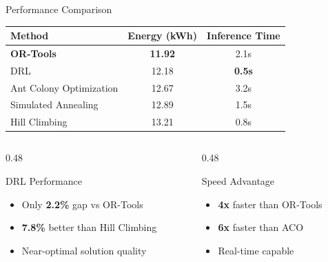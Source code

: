 \documentclass[aspectratio=169,11pt]{beamer}
\begin{document}
\begin{frame}{Performance Comparison}
    \begin{center}
        \begin{tabular}{lcc}
            \toprule
            \textbf{Method} & \textbf{Energy (kWh)} & \textbf{Inference Time} \\
            \midrule
            \textbf{OR-Tools} & \textbf{11.92} & 2.1s \\
            DRL  & 12.18 & \textbf{0.5s} \\
            Ant Colony Optimization & 12.67 & 3.2s \\
            Simulated Annealing & 12.89 & 1.5s \\
            Hill Climbing & 13.21 & 0.8s \\
            \bottomrule
        \end{tabular}
    \end{center}

    \vspace{0.5cm}
    \begin{columns}[T]
        \begin{column}{0.48\textwidth}
            \begin{exampleblock}{DRL Performance}
                \begin{itemize}
                    \item Only \textbf{2.2\%} gap vs OR-Tools
                    \item \textbf{7.8\%} better than Hill Climbing
                    \item Near-optimal solution quality
                \end{itemize}
            \end{exampleblock}
        \end{column}
        \begin{column}{0.48\textwidth}
            \begin{exampleblock}{Speed Advantage}
                \begin{itemize}
                    \item \textbf{4x} faster than OR-Tools
                    \item \textbf{6x} faster than ACO
                    \item Real-time capable
                \end{itemize}
            \end{exampleblock}
        \end{column}
    \end{columns}
\end{frame}
\end{document}
